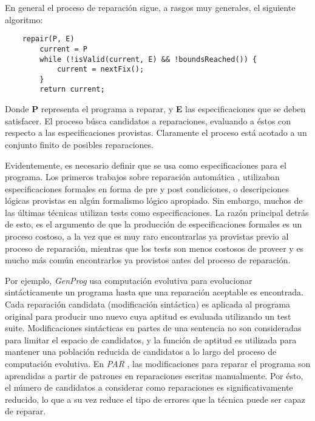 En general el proceso de reparaci\'on sigue, a rasgos muy generales, el siguiente algoritmo:

\begin{lstlisting}
	repair(P, E)
		current = P
		while (!isValid(current, E) && !boundsReached()) {
			current = nextFix();
		}
		return current;
\end{lstlisting}

Donde \textbf{P} representa el programa a reparar, y \textbf{E} las especificaciones que se deben satisfacer. El proceso b\'usca candidatos a reparaciones, evaluando a \'estos con respecto a las especificaciones provistas. Claramente el proceso est\'a acotado a un conjunto finito de posibles reparaciones.

Evidentemente, es necesario definir que se usa como especificaciones para el programa. Los primeros trabajos sobre reparaci\'on autom\'atica \cite{bibliography.repair.StaberJB05, bibliography.repair.ArcuriY08}, utilizaban especificaciones formales en forma de pre y post condiciones, o descripciones l\'ogicas provistas en alg\'un formalismo l\'ogico apropiado. Sin embargo, muchos de las \'ultimas t\'ecnicas utilizan tests como especificaciones. La raz\'on principal detr\'as de esto, es el argumento de que la producci\'on de especificaciones formales es un proceso costoso, a la vez que es muy raro encontrarlas ya provistas previo al proceso de reparaci\'on, mientras que los tests son menos costosos de proveer y es mucho m\'as com\'un encontrarlos ya provistos antes del proceso de reparaci\'on.


Por ejemplo, \emph{GenProg} \cite{bibliography.repair.GouesNFW12} usa computaci\'on evolutiva para evolucionar sint\'acticamente un programa hasta que una reparaci\'on aceptable es encontrada. Cada reparaci\'on candidata (modificaci\'on sint\'actica) es aplicada al programa original para producir uno nuevo cuya aptitud es evaluada utilizando un test suite. Modificaciones sint\'acticas en partes de una sentencia no son consideradas para limitar el espacio de candidatos, y la funci\'on de aptitud es utilizada para mantener una poblaci\'on reducida de candidatos a lo largo del proceso de computaci\'on evolutiva. En \emph{PAR} \cite{bibliography.repair.KimNSK13}, las modificaciones para reparar el programa son aprendidas a partir de patrones en reparaciones escritas manualmente. Por \'esto, el n\'umero de candidatos a considerar como reparaciones es significativamente reducido, lo que a su vez reduce el tipo de errores que la t\'ecnica puede ser capaz de reparar.

